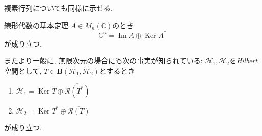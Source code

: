 \documentclass[titlepage]{jsarticle}
\numberwithin{equation}{section}
\newcommand{\C}{\mathbb{C}}%
\newcommand{\Ker}{\operatorname{Ker}}
\renewcommand{\Im}{\operatorname{Im}}
\begin{document}
複素行列についても同様に示せる. 
\begin{thm}{線形代数の基本定理}{}
$A \in M_n(\C)$のとき
\[
\C^n = \Im A \oplus \Ker A^*
\]
が成り立つ.
\end{thm}

\begin{marker}
またより一般に, 無限次元の場合にも次の事実が知られている:
$\mathcal{H}_1, \mathcal{H}_2$を\textit{Hilbert}空間として, $T \in \mathbf{B}(\mathcal{H}_1, \mathcal{H}_2)$とするとき
\begin{enumerate}
\item[(1)]$\mathcal{H}_1 = \Ker T \oplus \overline{\mathcal{R}(T^*)}$
\item[(2)]$\mathcal{H}_2 = \Ker T^* \oplus \overline{\mathcal{R}(T)}$
\end{enumerate}
が成り立つ.
\end{marker}
\end{document}
